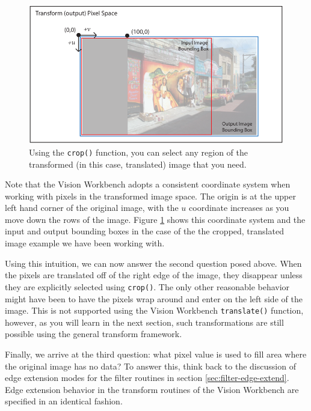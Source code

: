 \begin{figure}[tbp]
\begin{center}
  \includegraphics[width=5in]{images/transformed_mural.pdf}
\end{center}
  \caption{Using the {\tt crop()} function, you can select any region
    of the transformed (in this case, translated) image that you need.}
  \label{fig:transformed_mural}
\end{figure}

Note that the Vision Workbench adopts a consistent coordinate system
when working with pixels in the transformed image space.  The origin
is at the upper left hand corner of the original image, with the $u$
coordinate increases as you move down the rows of the image.  Figure
\ref{fig:transformed_mural} shows this coordinate system and the input
and output bounding boxes in the case of the the cropped, translated
image example we have been working with.

Using this intuition, we can now answer the second question posed
above.  When the pixels are translated off of the right edge of the
image, they disappear unless they are explicitly selected using
\verb#crop()#.  The only other reasonable behavior might have been to
have the pixels wrap around and enter on the left side of the image.
This is not supported using the Vision Workbench \verb#translate()#
function, however, as you will learn in the next section, such
transformations are still possible using the general transform
framework.

Finally, we arrive at the third question: what pixel value is used to
fill area where the original image has no data?  To answer this, think
back to the discussion of edge extension modes for the filter routines
in section \ref{sec:filter-edge-extend}.  Edge extension behavior in
the transform routines of the Vision Workbench are specified in an
identical fashion.

